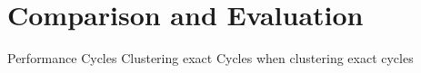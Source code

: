 \documentclass[preview]{standalone}
\begin{document}
\section{Comparison and Evaluation}
Performance Cycles
Clustering exact Cycles when clustering exact cycles
\end{document}
